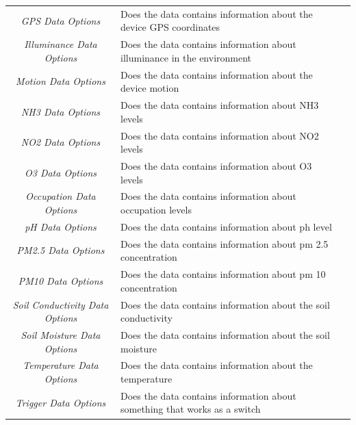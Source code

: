 \begin{landscape}
\begin{longtable}{cll}
   \textit{GPS Data Options}               & Does the data contains information about the device GPS coordinates\footnotemark[1]\footnotemark[2]       &  \\
   \textit{Illuminance Data Options}       & Does the data contains information about illuminance in the environment\footnotemark[1]\footnotemark[2]   &  \\
   \textit{Motion Data Options}            & Does the data contains information about the device motion\footnotemark[1]\footnotemark[2]                &  \\
   \textit{NH3 Data Options}               & Does the data contains information about NH3 levels\footnotemark[1]\footnotemark[2]                       &  \\
   \textit{NO2 Data Options}               & Does the data contains information about NO2 levels\footnotemark[1]\footnotemark[2]                       &  \\
   \textit{O3 Data Options}                & Does the data contains information about O3 levels\footnotemark[1]\footnotemark[2]                        &  \\
   \textit{Occupation Data Options}        & Does the data contains information about occupation levels\footnotemark[1]\footnotemark[2]                &  \\
   \textit{pH Data Options}                & Does the data contains information about ph level\footnotemark[1]\footnotemark[2]                         &  \\
   \textit{PM2.5 Data Options}             & Does the data contains information about pm 2.5 concentration\footnotemark[1]\footnotemark[2]             &  \\
   \textit{PM10 Data Options}              & Does the data contains information about pm 10 concentration\footnotemark[1]\footnotemark[2]              &  \\
   \textit{Soil Conductivity Data Options} & Does the data contains information about the soil conductivity\footnotemark[1]\footnotemark[2]            &  \\
   \textit{Soil Moisture Data Options}     & Does the data contains information about the soil moisture\footnotemark[1]\footnotemark[2]                &  \\
   \textit{Temperature Data Options}       & Does the data contains information about the temperature\footnotemark[1]\footnotemark[2]                  &  \\
   \textit{Trigger Data Options}           & Does the data contains information about something that works as a switch\footnotemark[1]\footnotemark[2] &  \\

\end{longtable}
\end{landscape}

